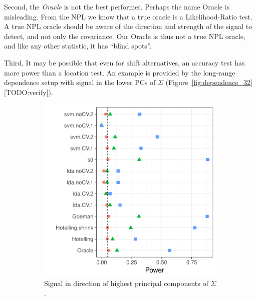 \documentclass[12pt,a4paper]{article}
\begin{document}
Second, the \emph{Oracle} is not the best performer.
Perhaps the name Oracle is misleading. 
From the NPL we know that a true oracle is a Likelihood-Ratio test. 
A true NPL oracle should be aware of the direction and strength of the signal to detect, and not only the covariance.  
Our Oracle is thus not a true NPL oracle, and like any other statistic, it has ``blind spots''.


Third, It may be possible that even for shift alternatives, an accuracy test has more power than a location test. 
An example is provided by the long-range dependence setup with signal in the lower PCs of $\Sigma$ (Figure~\ref{fig:dependence_32} [TODO:verify]).



\begin{figure}[h]
	\centering
	\caption{Short memory, AR(1) correlation. 
	$\Sigma_{k,l}=\rho^{|k-l|}; \rho=0.6$}	
	\begin{subfigure}[t]{.3\textwidth}
	\centering
	\includegraphics[width=1\linewidth]{"art/file20"}
	\caption{Signal in direction of highest principal components of $\Sigma$.} 
	\label{fig:dependence_11}
	\end{subfigure}
	\begin{subfigure}[t]{.3\textwidth}
		\centering

\end{subfigure}
\end{figure}
\end{document}
